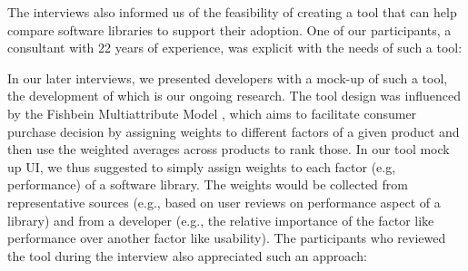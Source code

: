 The interviews also informed us of the feasibility of creating a tool that can help compare software libraries to support their adoption. One of our participants, a consultant with 22 years of experience, was explicit with the needs of such a tool: 

In our later interviews, we presented developers with a mock-up of such a tool, the development of which is our ongoing research. The tool design was influenced by the Fishbein Multiattribute Model \cite{fishbein1967attitude}, which aims to facilitate consumer purchase decision by assigning weights to different factors of a given product and then use the weighted averages across products to rank those. In our tool mock up UI, we thus suggested to simply assign weights to each factor (e.g, performance) of a software library. The weights would be collected from representative sources (e.g., based on user reviews on performance aspect of a library) and from a developer (e.g., the relative importance of the factor like performance over another factor like usability).
The participants who reviewed the tool during the interview also appreciated such an approach: 

